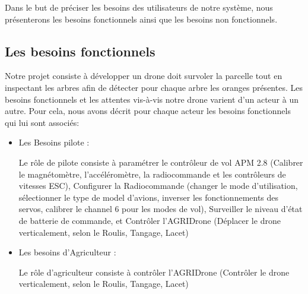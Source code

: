 	
	Dans le but de préciser les besoins des utilisateurs de notre système, nous présenterons les besoins fonctionnels ainsi que les besoins non fonctionnels.
	
	\subsection{Les besoins fonctionnels}
	Notre projet consiste à développer un drone doit survoler la parcelle tout en inspectant les arbres afin de détecter pour chaque arbre les oranges présentes.
	Les besoins fonctionnels et les attentes vis-à-vis notre drone varient d'un acteur à un autre. 
	Pour cela, nous avons décrit pour chaque acteur les besoins fonctionnels qui lui sont associés:
	
	
	\begin{itemize}
		\item Les Besoins pilote :
		
		
		Le rôle de pilote consiste à paramétrer le contrôleur de vol APM 2.8 (Calibrer le magnétomètre, l'accéléromètre, la radiocommande et les contrôleurs de vitesses ESC), Configurer la Radiocommande (changer le mode d'utilisation, sélectionner le type de model d'avions, inverser les fonctionnements des servos, calibrer le channel 6 pour les modes de vol), Surveiller le niveau d'état de batterie de commande,  et Contrôler l’AGRIDrone (Déplacer le drone verticalement, selon le Roulis, Tangage, 
		Lacet) 
		
		\item Les besoins d'Agriculteur :
		
		Le rôle d'agriculteur consiste à contrôler l’AGRIDrone (Contrôler le drone verticalement, selon le Roulis, Tangage, Lacet)
		
		
		
	\end{itemize}	
	
